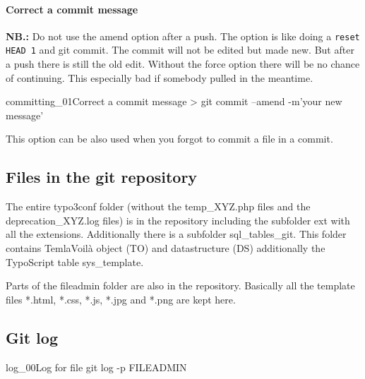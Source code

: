 \paragraph{Correct a commit message}
\textbf{NB.:} Do not use the amend option after a push. The option is like doing a \texttt{reset HEAD~1} and git commit. The commit will not be edited but made new. But after a push there is still the old edit. Without the force option there will be no chance of continuing. This especially bad if somebody pulled in the meantime.
\begin{codelisting}{committing_01}{Correct a commit message}
> git commit --amend -m'your new message'
\end{codelisting}
This option can be also used when you forgot to commit a file in a commit.
\subsection{Files in the git repository}
The entire typo3conf folder (without the temp\_XYZ.php files and the deprecation\_XYZ.log files) is in the repository including the subfolder ext with all the extensions. Additionally there is a subfolder sql\_tables\_git. This folder contains TemlaVoilà object (TO) and datastructure (DS) additionally the TypoScript table sys\_template.

Parts of the fileadmin folder are also in the repository. Basically all the template files *.html, *.css, *.js, *.jpg and *.png are kept here.
\subsection{Git log}
\begin{codelisting}{log_00}{Log for file}
git log -p FILEADMIN
\end{codelisting}
\nopagebreak[4]
